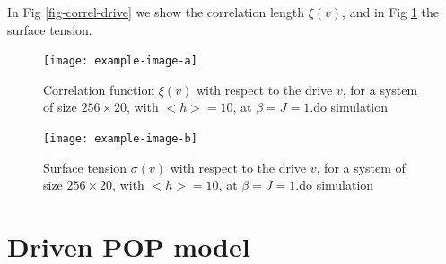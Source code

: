 {In Fig \ref{fig-correl-drive} we show the correlation length $\xi(v)$, and in Fig \ref{fig-sigma-drive} the surface tension. 

\begin{figure}
    \centering
    \texttt{[image: example-image-a]}
    \caption{Correlation function $\xi(v)$ with respect to the drive $v$, for a system of size $256 \times 20$, with $<h> = 10$, at $\beta = J = 1$.{\color{red}do simulation}}
    \label{fig-correl-drive}    
    \texttt{[image: example-image-b]}
    \caption{Surface tension $\sigma(v)$ with respect to the drive $v$, for a system of size $256 \times 20$, with $<h> = 10$, at $\beta = J = 1$.{\color{red}do simulation}}    
    \label{fig-sigma-drive}
\end{figure}
}
    \section{Driven POP model}
%
